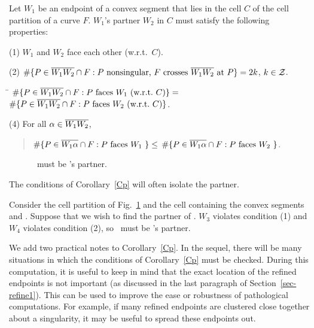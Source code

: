 \begin{corollary}
\label{Cp}
Let $W_{1}$ be an endpoint of a convex segment that lies in the cell $C$ 
of the cell partition of a curve $F$.
$W_{1}$'s partner $W_{2}$ in $C$ must satisfy the following properties:

{\rm (1)} $W_{1}$ and $W_{2}$ face each other {\rm (}w.r.t.\ $C${\rm )}.

{\rm (2)} $\#\{P \in \mbox{$\overline{W_{1}W_{2}}$} \cap F: P \mbox{ nonsingular,
	$F$ crosses } \mbox{$\overline{\mbox{$W_{1}$}\mbox{$W_{2}$}}$} \mbox{ at } P\} = 2k$, $k \in {\cal Z}$.

\begin{tabbing}
 \= $\#\{P \in \seg{W_{1}W_{2}} \cap F: 
	P \mbox{ faces \wo\ 
	{\rm (}w.r.t.\ $C${\rm )}}\} = $\\
\> $\#\{P \in \seg{W_{1}W_{2}} \cap F: P \mbox{ faces \wt\ 
	{\rm (}w.r.t.\ $C${\rm )}}\}$.
\end{tabbing}

{\rm (4)} For all $\alpha \in \mbox{$\overline{\mbox{$W_{1}$}\mbox{$W_{2}$}}$}$,\ \ \nopagebreak
\begin{quote}
	$\#\{P \in\mbox{$\overline{\mbox{$W_{1}$}\alpha}$}\cap F: P \mbox{ faces \mbox{$W_{1}$}\ }\} \leq $
	$\#\{P \in\mbox{$\overline{\mbox{$W_{1}$}\alpha}$}\cap F: P \mbox{ faces \mbox{$W_{2}$}\ }\}$.
\end{quote}
\end{corollary}

\begin{figure}[htbp]\vspace{2.25in}\caption{\wt\ must be \wo's partner.}
\label{3.12}\end{figure}

\noindent The conditions of Corollary~\ref{Cp} will often isolate 
the partner.

\begin{example}
{\rm 
Consider the cell partition of Fig.~\ref{3.12} and the cell containing
the convex segments \arc{\wo\wt} and .
Suppose that we wish to find the partner of \wo.
$W_{3}$ violates condition (1) and $W_{4}$ violates condition (2), 
so \wt\ must be \wo's partner.
}
\end{example}

We add two practical notes to Corollary~\ref{Cp}.
In the sequel,
there will be many situations in which the conditions of Corollary~\ref{Cp}
must be checked.
During this computation, it is useful to keep in mind that the exact 
location of the
refined endpoints is not important (as discussed in the last paragraph of
Section~\ref{sec-refine1}).
This can be used to improve the ease or robustness of pathological 
computations.
For example, if many refined endpoints are clustered close together about 
a singularity,
it may be useful to spread these endpoints out.

